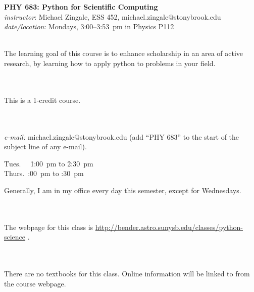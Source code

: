 \documentclass[11pt]{article}
\begin{document}
\begin{center}
{\Large \bf PHY 683: Python for Scientific Computing} \\[0.25em]
{\em instructor}\/: Michael Zingale, ESS 452, michael.zingale@stonybrook.edu \\
{\em date/location}\/: Mondays, 3:00--3:53~pm in Physics P112
\end{center}

 \\
The learning goal of this course is to enhance scholarship in an area
of active research, by learning how to apply python to problems
in your field.

\ \\[-2mm]
 \\
This is a 1-credit course.


\ \\[-2mm]
  \\
{\em e-mail:} michael.zingale@stonybrook.edu ({add ``PHY 683'' to the
 start of the subject line of any e-mail}).
%
\begin{tabbing}
 \= Tues.~~  \=1:00~pm \=to \=2:30~pm \\
                              \> Thurs.\ :00~pm \>to :30~pm
\end{tabbing}
Generally, I am in my office every day this semester, except for Wednesdays.

\ \\[-2mm]
 \\
The webpage for this class is \url{http://bender.astro.sunysb.edu/classes/python-science} .

\ \\[-2mm]
 \\
There are no textbooks for this class.  Online information
will be linked to from the course webpage.
\end{document}
